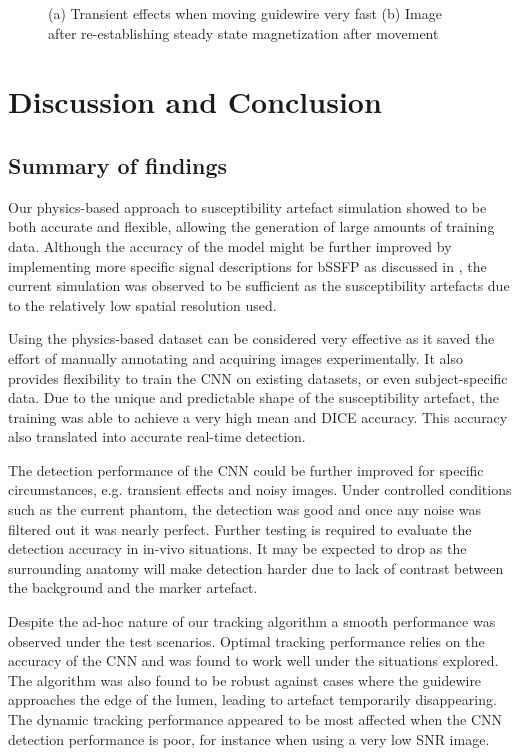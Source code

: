 \documentclass[conference]{IEEEtran}
\begin{document}
\begin{figure}[ht]
\begin{minipage}{0.241\textwidth}
    \end{minipage}\hfill \hspace*{0cm}
    \caption{(a) Transient effects when moving guidewire very fast
    (b) Image after re-establishing steady state magnetization after movement}
    \label{fig:flow-artefacts-tracking}
\end{figure}


\section{Discussion and Conclusion}

\subsection{Summary of findings}
Our physics-based approach to susceptibility artefact simulation showed to be both accurate and flexible, allowing the generation of large amounts of training data. Although the accuracy of the model might be further improved by implementing more specific signal descriptions for bSSFP as discussed in \cite{sunil-patil-phd}, the current simulation was observed to be sufficient as the susceptibility artefacts due to the relatively low spatial resolution used.

Using the physics-based dataset can be considered very effective as it saved the effort of manually annotating and acquiring images experimentally. It also provides flexibility to train the CNN on existing datasets, or even subject-specific data. Due to the unique and predictable shape of the susceptibility artefact, the training was able to achieve a very high mean and DICE accuracy. This accuracy also translated into accurate real-time detection.

The detection performance of the CNN could be further improved for specific circumstances, e.g. transient effects and noisy images. Under controlled conditions such as the current phantom, the detection was good and once any noise was filtered out it was nearly perfect. Further testing is required to evaluate the detection accuracy in in-vivo situations. It may be expected to drop as the surrounding anatomy will make detection harder due to lack of contrast between the background and the marker artefact.

Despite the ad-hoc nature of our tracking algorithm a smooth performance was observed under the test scenarios. Optimal tracking performance relies on the accuracy of the CNN and was found to work well under the situations explored. The algorithm was also found to be robust against cases where the guidewire approaches the edge of the lumen, leading to artefact temporarily disappearing. The dynamic tracking performance appeared to be most affected when the CNN detection performance is poor, for instance when using a very low SNR image.
\end{document}
